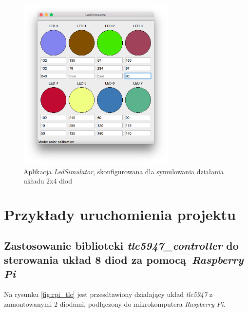\documentclass[eng,printmode]{mgr}
\begin{document}
\begin{figure}[!ht]
    \centering
    \includegraphics[width=0.7\textwidth]{Figures/ledSimulator3.png} 
    \caption{Aplikacja \emph{LedSimulator}, skonfigurowana dla symulowania działania układu 2x4 diod}
    \label{fig:ledSimulator3}
\end{figure}

\chapter{Przykłady uruchomienia projektu}

\section{Zastosowanie biblioteki \emph{tlc5947\_controller} do sterowania układ 8 diod za pomocą \emph{Raspberry Pi}}

Na rysunku \ref{fig:rpi_tlc} jest przesdtawiony działający układ \emph{tlc5947} z zamontowanymi 2 diodami, podłączony do mikrokomputera \emph{Raspberry Pi}.
\end{document}
